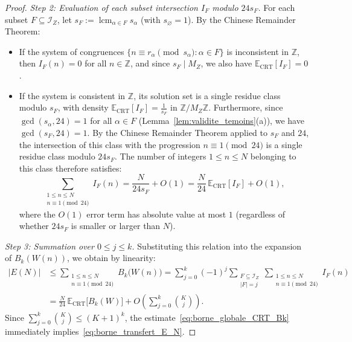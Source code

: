\documentclass[11pt, a4paper]{article}
\theoremstyle{plain}
\theoremstyle{definition}
\newcommand{\Z}{\mathbb{Z}}
\newcommand{\Ebb}{\mathbb{E}}
\begin{document}
\begin{proof}
\medskip\noindent\emph{Step 2: Evaluation of each subset intersection $I_F$ modulo $24 s_F$.}
For each subset $F \subseteq \mathcal{I}_Z$, let $s_F := \operatorname{lcm}_{\alpha \in F} s_\alpha$ (with $s_\varnothing = 1$). By the Chinese Remainder Theorem:
\begin{itemize}
    \item If the system of congruences $\{n \equiv r_\alpha \pmod{s_\alpha} : \alpha \in F\}$ is inconsistent in $\Z$, then $I_F(n) = 0$ for all $n \in \Z$, and since $s_F \mid M_Z$, we also have $\Ebb_{\mathrm{CRT}}[I_F] = 0$.
    \item If the system is consistent in $\Z$, its solution set is a single residue class modulo $s_F$, with density $\Ebb_{\mathrm{CRT}}[I_F] = \frac{1}{s_F}$ in $\Z / M_Z \Z$. Furthermore, since $\gcd(s_\alpha, 24) = 1$ for all $\alpha \in F$ (Lemma~\ref{lem:validite_temoins}(a)), we have $\gcd(s_F, 24) = 1$. By the Chinese Remainder Theorem applied to $s_F$ and $24$, the intersection of this class with the progression $n \equiv 1 \pmod{24}$ is a single residue class modulo $24 s_F$. The number of integers $1 \le n \le N$ belonging to this class therefore satisfies:
    \[
    \sum_{\substack{1 \le n \le N \\ n \equiv 1 \pmod{24}}} I_F(n) = \frac{N}{24 s_F} + O(1) = \frac{N}{24}\,\Ebb_{\mathrm{CRT}}[I_F] + O(1),
    \]
    where the $O(1)$ error term has absolute value at most $1$ (regardless of whether $24 s_F$ is smaller or larger than $N$).
\end{itemize}

\medskip\noindent\emph{Step 3: Summation over $0 \le j \le k$.}
Substituting this relation into the expansion of $B_k(W(n))$, we obtain by linearity:
\begin{align*}
|E(N)| &\le \sum_{\substack{1 \le n \le N \\ n \equiv 1 \pmod{24}}} B_k\big(W(n)\big) = \sum_{j=0}^k (-1)^j \sum_{\substack{F \subseteq \mathcal{I}_Z \\ |F| = j}} \sum_{\substack{1 \le n \le N \\ n \equiv 1 \pmod{24}}} I_F(n) \\
&= \frac{N}{24}\,\Ebb_{\mathrm{CRT}}\big[B_k(W)\big] + O\!\left( \sum_{j=0}^k \binom{K}{j} \right).
\end{align*}
Since $\sum_{j=0}^k \binom{K}{j} \le (K+1)^k$, the estimate~\eqref{eq:borne_globale_CRT_Bk} immediately implies~\eqref{eq:borne_transfert_E_N}.
\end{proof}
\end{document}
